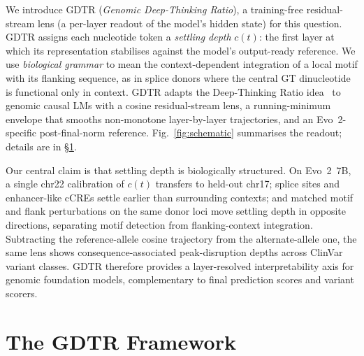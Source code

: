 \documentclass{article}
\theoremstyle{plain}
\theoremstyle{definition}
\theoremstyle{remark}
\newcommand{\gDTR}{\textsc{GDTR}}
\begin{document}
We introduce \gDTR{} (\emph{Genomic Deep-Thinking Ratio}), a training-free residual-stream lens (a per-layer readout of the model's hidden state) for this question. \gDTR{} assigns each nucleotide token a \emph{settling depth} $c(t)$: the first layer at which its representation stabilises against the model's output-ready reference. We use \emph{biological grammar} to mean the context-dependent integration of a local motif with its flanking sequence, as in splice donors where the central GT dinucleotide is functional only in context. \gDTR{} adapts the Deep-Thinking Ratio idea~\cite{chen2026deepthinking} to genomic causal LMs with a cosine residual-stream lens, a running-minimum envelope that smooths non-monotone layer-by-layer trajectories, and an Evo~2-specific post-final-norm reference. Fig.~\ref{fig:schematic} summarises the readout; details are in \S\ref{sec:framework}.

Our central claim is that settling depth is biologically structured. On Evo~2~7B, a single chr22 calibration of $c(t)$ transfers to held-out chr17; splice sites and enhancer-like cCREs settle earlier than surrounding contexts; and matched motif and flank perturbations on the same donor loci move settling depth in opposite directions, separating motif detection from flanking-context integration. Subtracting the reference-allele cosine trajectory from the alternate-allele one, the same lens shows consequence-associated peak-disruption depths across ClinVar variant classes. \gDTR{} therefore provides a layer-resolved interpretability axis for genomic foundation models, complementary to final prediction scores and variant scorers.

\section{The \gDTR{} Framework}
\label{sec:framework}
\end{document}
